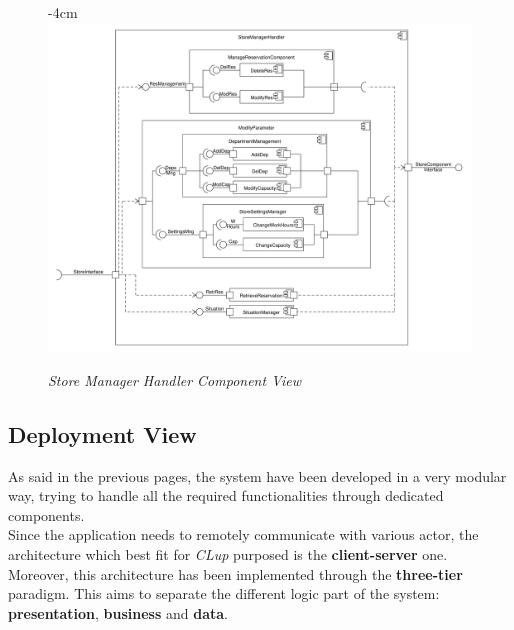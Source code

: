 \documentclass{article}
\begin{document}
		\begin{figure}[H]
			\begin{adjustwidth} {-4cm}{}
				\centering
				\includegraphics[scale=0.45]{Component Diagrams/StoreManagerHandlerComponentView.pdf}\\
			\end{adjustwidth}
			\caption{\emph{Store Manager Handler Component View}}
		\end{figure}
		\newpage
	\subsection{Deployment View}
	As said in the previous pages, the system have been developed in a very modular way, trying to handle all the required functionalities through dedicated components.\\
	Since the application needs to remotely communicate with various actor, the architecture which best fit for \emph{CLup} purposed is the {\bfseries client-server} one. Moreover, this architecture has been implemented through the {\bfseries three-tier} paradigm. This aims to separate the different logic part of the system: {\bfseries presentation}, {\bfseries business} and {\bfseries data}.
\end{document}
